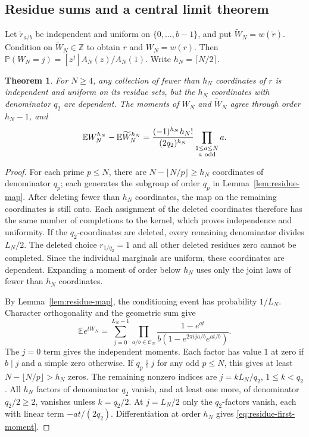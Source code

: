\documentclass[11pt]{amsart}
\newtheorem{theorem}{Theorem}[section]
\theoremstyle{remark}
\newcommand{\Z}{\mathbb Z}
\newcommand{\CN}{\mathcal C_N}
\begin{document}
\subsection{Residue sums and a central limit theorem}

Let \(\widetilde r_{a/b}\) be independent and uniform on
\(\{0,\ldots,b-1\}\), and put \(\widetilde W_N=w(\widetilde r)\).
Condition on \(\widetilde W_N\in\Z\) to obtain \(r\) and \(W_N=w(r)\).
Then \(\mathbb P(W_N=j)=[z^j]A_N(z)/A_N(1)\). Write \(h_N=\lceil N/2\rceil\).

\begin{theorem}\label{thm:residue-moments}
For \(N\ge4\), any collection of fewer than \(h_N\) coordinates of \(r\)
is independent and uniform on its residue sets, but the \(h_N\) coordinates
with denominator \(q_2\) are dependent. The moments of \(W_N\) and
\(\widetilde W_N\) agree through order \(h_N-1\), and
\begin{equation}\label{eq:residue-first-moment}
 \mathbb E W_N^{h_N}-\mathbb E\widetilde W_N^{h_N}
 =\frac{(-1)^{h_N}h_N!}{(2q_2)^{h_N}}
   \prod_{\substack{1\le a\le N\\a\ {\rm odd}}}a .
\end{equation}
\end{theorem}

\begin{proof}
For each prime \(p\le N\), there are
\(N-\lfloor N/p\rfloor\ge h_N\) coordinates of denominator \(q_p\);
each generates the subgroup of order \(q_p\) in
Lemma~\ref{lem:residue-map}. After deleting fewer than \(h_N\)
coordinates, the map on the remaining coordinates is still onto.
Each assignment of the deleted coordinates therefore has the same
number of completions to the kernel, which proves independence and
uniformity. If the \(q_2\)-coordinates are deleted, every remaining
denominator divides \(L_N/2\). The deleted choice \(r_{1/q_2}=1\)
and all other deleted residues zero cannot be completed. Since the
individual marginals are uniform, these coordinates are dependent.
Expanding a moment of order below \(h_N\) uses only the joint laws
of fewer than \(h_N\) coordinates.

By Lemma~\ref{lem:residue-map}, the conditioning event has probability
\(1/L_N\). Character orthogonality and the geometric sum give
\begin{equation}\label{eq:residue-fourier}
 \mathbb E e^{tW_N}
 =\sum_{j=0}^{L_N-1}\prod_{a/b\in\CN}
 \frac{1-e^{at}}{b(1-e^{2\pi i ja/b}e^{at/b})}.
\end{equation}
The \(j=0\) term gives the independent moments. Each factor has
value \(1\) at zero if \(b\mid j\) and a simple zero otherwise.
If \(q_p\nmid j\) for any odd \(p\le N\), this gives at least
\(N-\lfloor N/p\rfloor>h_N\) zeros. The remaining nonzero indices are
\(j=kL_N/q_2\), \(1\le k<q_2\). All \(h_N\) factors of denominator \(q_2\)
vanish, and at least one more, of denominator \(q_2/2\ge2\), vanishes
unless \(k=q_2/2\). At \(j=L_N/2\) only the \(q_2\)-factors vanish,
each with linear term \(-at/(2q_2)\). Differentiation at order \(h_N\)
gives \eqref{eq:residue-first-moment}.
\end{proof}
\end{document}
